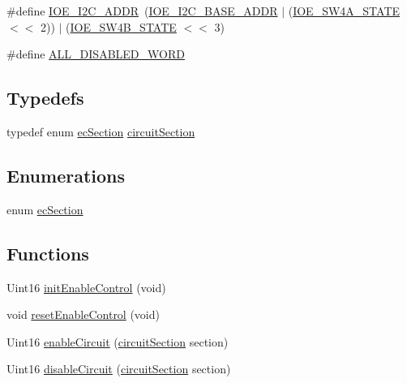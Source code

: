 \begin{DoxyCompactItemize}
\item 
\#define \hyperlink{a00023_ad615a329bea187ce779cf9930ba8a6fa}{I\-O\-E\-\_\-\-I2\-C\-\_\-\-A\-D\-D\-R}~(\hyperlink{a00023_ab848e49bf7c4ea73e4ef05f26b3c60e8}{I\-O\-E\-\_\-\-I2\-C\-\_\-\-B\-A\-S\-E\-\_\-\-A\-D\-D\-R} $|$ (\hyperlink{a00023_a0cfe7137edc026282b36312077954701}{I\-O\-E\-\_\-\-S\-W4\-A\-\_\-\-S\-T\-A\-T\-E} $<$$<$ 2)) $|$ (\hyperlink{a00023_a5704aece7ac84dbd34e918fc0c60108d}{I\-O\-E\-\_\-\-S\-W4\-B\-\_\-\-S\-T\-A\-T\-E} $<$$<$ 3)
\item 
\#define \hyperlink{a00023_a79846f375935e81b3781b88b40405d38}{A\-L\-L\-\_\-\-D\-I\-S\-A\-B\-L\-E\-D\-\_\-\-W\-O\-R\-D}
\end{DoxyCompactItemize}
\subsection*{Typedefs}
\begin{DoxyCompactItemize}
\item 
typedef enum \hyperlink{a00023_a693dd7ac614cd1a7f8bfd7440f34ed6f}{ec\-Section} \hyperlink{a00023_a5d2cb2e2fccefcdcb2e72e9e88b94223}{circuit\-Section}
\end{DoxyCompactItemize}
\subsection*{Enumerations}
\begin{DoxyCompactItemize}
\item 
enum \hyperlink{a00023_a693dd7ac614cd1a7f8bfd7440f34ed6f}{ec\-Section} 
\end{DoxyCompactItemize}
\subsection*{Functions}
\begin{DoxyCompactItemize}
\item 
Uint16 \hyperlink{a00023_ae6fd4f744738c8b2733ef36d92fb7313}{init\-Enable\-Control} (void)
\item 
void \hyperlink{a00023_a7e7f2b9153314c4652c5e0a1d2977133}{reset\-Enable\-Control} (void)
\item 
Uint16 \hyperlink{a00023_a5f4a447d1fbeba7920434b60e33b521e}{enable\-Circuit} (\hyperlink{a00023_a5d2cb2e2fccefcdcb2e72e9e88b94223}{circuit\-Section} section)
\item 
Uint16 \hyperlink{a00023_a606ff8e8b51f82c70ced419dad90f993}{disable\-Circuit} (\hyperlink{a00023_a5d2cb2e2fccefcdcb2e72e9e88b94223}{circuit\-Section} section)
\end{DoxyCompactItemize}


